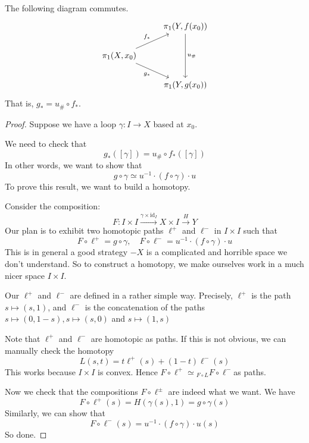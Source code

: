 \documentclass[a4paper, 10pt, twocolumn]{amsart}
\begin{document}
\begin{lemma}
  The following diagram commutes.
\[\begin{tikzcd}
	& {\pi_1(Y, f(x_0))} \\
	{\pi_1(X, x_0)} \\
	& {\pi_1(Y, g(x_0))}
	\arrow["{f_*}", from=2-1, to=1-2]
	\arrow["{u_\#}", from=1-2, to=3-2]
	\arrow["{g_*}"', from=2-1, to=3-2]
\end{tikzcd}\]
That is, $g_* = u_\# \circ f_*$.
\end{lemma}
\begin{proof}
Suppose we have a loop $\gamma: I \rightarrow X$ based at $x_0$.

We need to check that
$$
g_*([\gamma])=u_{\#} \circ f_*([\gamma])
$$
In other words, we want to show that
$$
g \circ \gamma \simeq u^{-1} \cdot(f \circ \gamma) \cdot u
$$
To prove this result, we want to build a homotopy. 

Consider the composition:
$$
F: I \times I \stackrel{\gamma \times \mathrm{id}_I}{\longrightarrow} X \times I \stackrel{H}{\longrightarrow} Y
$$
Our plan is to exhibit two homotopic paths $\ell^{+}$ and $\ell^{-}$ in $I \times I$ such that
$$
F \circ \ell^{+}=g \circ \gamma, \quad F \circ \ell^{-}=u^{-1} \cdot(f \circ \gamma) \cdot u
$$
This is in general a good strategy $-X$ is a complicated and horrible space we don't understand. So to construct a homotopy, we make ourselves work in a much nicer space $I \times I$.

Our $\ell^{+}$ and $\ell^{-}$ are defined in a rather simple way. Precisely, $\ell^{+}$ is the path $s \mapsto(s, 1)$, and $\ell^{-}$ is the concatenation of the paths $s \mapsto(0,1-s), s \mapsto(s, 0)$ and $s \mapsto(1, s)$

Note that $\ell^{+}$ and $\ell^{-}$ are homotopic as paths. If this is not obvious, we can manually check the homotopy
$$
L(s, t)=t \ell^{+}(s)+(1-t) \ell^{-}(s)
$$
This works because $I \times I$ is convex. Hence $F \circ \ell^{+} \simeq{ }_{F \circ L} F \circ \ell^{-}$as paths.

Now we check that the compositions $F \circ \ell^{ \pm}$ are indeed what we want. We have
$$
F \circ \ell^{+}(s)=H(\gamma(s), 1)=g \circ \gamma(s)
$$
Similarly, we can show that
$$
F \circ \ell^{-}(s)=u^{-1} \cdot(f \circ \gamma) \cdot u(s)
$$
So done.
\end{proof}
\end{document}
